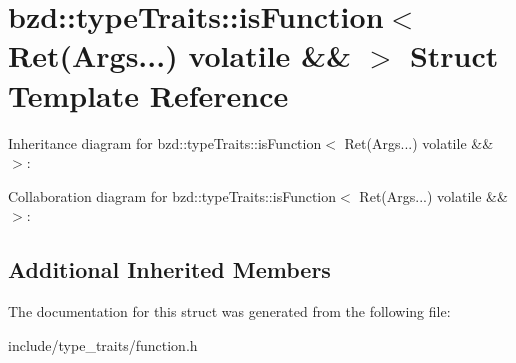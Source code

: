 \hypertarget{structbzd_1_1typeTraits_1_1isFunction_3_01Ret_07Args_8_8_8_08_01volatile_01_6_6_01_4}{}\section{bzd\+:\+:type\+Traits\+:\+:is\+Function$<$ Ret(Args...) volatile \&\& $>$ Struct Template Reference}
\label{structbzd_1_1typeTraits_1_1isFunction_3_01Ret_07Args_8_8_8_08_01volatile_01_6_6_01_4}


Inheritance diagram for bzd\+:\+:type\+Traits\+:\+:is\+Function$<$ Ret(Args...) volatile \&\& $>$\+:


Collaboration diagram for bzd\+:\+:type\+Traits\+:\+:is\+Function$<$ Ret(Args...) volatile \&\& $>$\+:
\subsection*{Additional Inherited Members}


The documentation for this struct was generated from the following file\+:\begin{DoxyCompactItemize}
\item 
include/type\+\_\+traits/function.\+h\end{DoxyCompactItemize}

